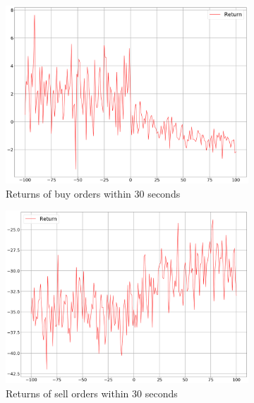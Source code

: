 \begin{figure}[H]
\begin{subfigure}[b]{0.45\textwidth}
        \includegraphics[width=\textwidth]{images/behaviour-30s-buy.png}
        \caption{Returns of buy orders within 30 seconds}
        \label{fig:behvaiour-down-30s-buy}
    \end{subfigure}
    \begin{subfigure}[b]{0.45\textwidth}
        \includegraphics[width=\textwidth]{images/behaviour-30s-sell.png}
        \caption{Returns of sell orders within 30 seconds}
        \label{fig:behvaiour-down-30s-sell}
    \end{subfigure}
    \begin{subfigure}[b]{0.45\textwidth}

\end{subfigure}
\end{figure}
